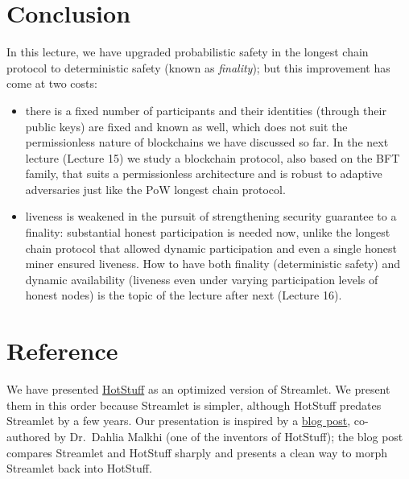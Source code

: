 \documentclass{article}
\newcommand{\pramod}[1]{{\color{red}
\footnotesize[Pramod: #1] }}
\begin{document}

\section*{Conclusion}

 In this lecture, we have  upgraded  probabilistic safety in the longest chain protocol to deterministic safety (known as {\em finality}); but this improvement has  come at two costs:
 \begin{itemize}
     \item there is a fixed number of  participants and their identities (through their public keys) are fixed and known as well, which does not suit the permissionless nature of blockchains we have discussed so far. In the next lecture (Lecture 15) we study a blockchain protocol, also based on the BFT family, that suits a permissionless architecture and is robust to adaptive adversaries just like the PoW longest chain  protocol.  
     \item liveness is weakened in the pursuit of strengthening security guarantee to a finality: substantial honest participation is needed now, unlike the longest chain protocol that allowed dynamic participation and even a single honest miner ensured liveness.   How to have both finality (deterministic safety) and dynamic availability (liveness even under varying participation levels of honest nodes) is the topic of the lecture after next (Lecture 16). 
 \end{itemize} 
 
 \section*{Reference}
We have presented  \href{https://arxiv.org/pdf/1803.05069.pdf}{HotStuff} as  an optimized version of Streamlet. We present them in this order  because Streamlet is simpler, although HotStuff predates Streamlet by a few years.  Our presentation is inspired by a \href{https://dahliamalkhi.github.io/posts/2020/12/what-they-didnt-teach-you-in-streamlet/}{ blog post}, co-authored  by Dr.~Dahlia Malkhi (one of the inventors of HotStuff); the blog post compares Streamlet and HotStuff sharply and presents a clean way to morph Streamlet back into HotStuff.
\end{document}
